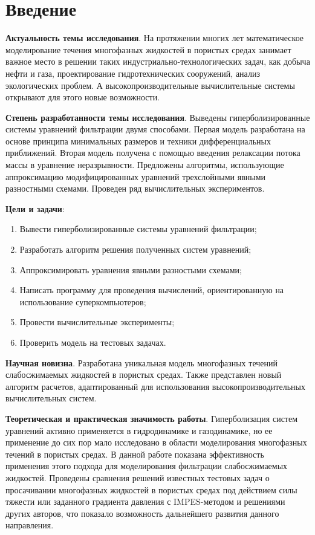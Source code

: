 \chapter*{Введение}                         %
\textbf{Актуальность темы исследования}. На протяжении многих лет математическое моделирование течения многофазных жидкостей в пористых средах занимает важное место в решении таких индустриально-технологических задач, как добыча нефти и газа, проектирование гидротехнических сооружений, анализ экологических проблем. 
А высокопроизводительные вычислительные системы открывают для этого новые возможности.

\textbf{Степень разработанности темы исследования}. Выведены гиперболизированные системы уравнений фильтрации двумя способами.
Первая модель разработана на основе принципа минимальных размеров и техники дифференциальных приближений.
Вторая модель получена с помощью введения релаксации потока массы в уравнение неразрывности.
Предложены алгоритмы, использующие аппроксимацию модифицированных уравнений трехслойными явными
разностными схемами. Проведен ряд вычислительных экспериментов.

\textbf{Цели и задачи}:
\begin{enumerate}
 \item Вывести гиперболизированные системы уравнений фильтрации;
 \item Разработать алгоритм решения полученных систем уравнений;
 \item Аппроксимировать уравнения явными разностыми схемами;
 \item Написать программу для проведения вычислений, ориентированную на использование суперкомпьютеров;
 \item Провести вычислительные эксперименты;
 \item Проверить модель на тестовых задачах.
\end{enumerate}

\textbf{Научная новизна}. Разработана уникальная модель многофазных течений слабосжимаемых жидкостей в пористых средах.
Также представлен новый алгоритм расчетов, адаптированный для использования высокопроизводительных вычислительных систем.

\textbf{Теоретическая и практическая значимость работы}. Гиперболизация систем уравнений активно применяется в гидродинамике и газодинамике, но ее применение  до сих пор мало исследовано в области моделирования многофазных течений в пористых средах. В данной работе показана эффективность применения этого подхода для моделирования фильтрации слабосжимаемых жидкостей. Проведены сравнения решений известных тестовых задач о просачивании многофазных жидкостей в пористых средах под действием силы тяжести или заданного градиента давления с IMPES-методом и решениями других авторов, что показало возможность дальнейшего развития данного направления.

